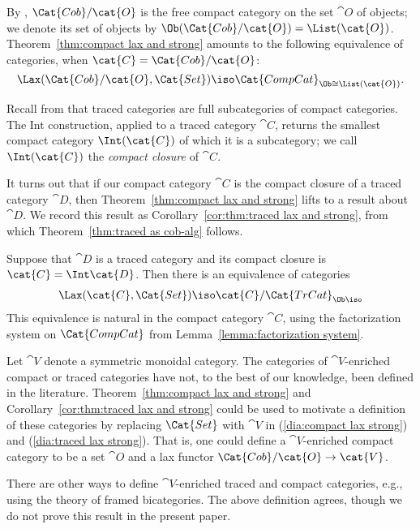 By \cite{Abramsky}, $\Cat{Cob}/\cat{O}$ is the free compact category on the set $\cat{O}$ of objects; we denote its set of objects by $\Ob(\Cat{Cob}/\cat{O})=\List(\cat{O})$. Theorem~\ref{thm:compact lax and strong} amounts to the following equivalence of categories, when $\cat{C}=\Cat{Cob}/\cat{O}$:
$$\Lax(\Cat{Cob}/\cat{O},\Cat{Set})\iso\Cat{CompCat}_{\Ob\cong\List(\cat{O})}.$$

Recall from \cite{JoyalStreetVerity} that traced categories are full subcategories of compact categories. The Int construction, applied to a traced category $\cat{C}$, returns the smallest compact category $\Int(\cat{C})$ of which it is a subcategory; we call $\Int(\cat{C})$ the \emph{compact closure} of $\cat{C}$. 

It turns out that if our compact category $\cat{C}$ is the compact closure of a traced category $\cat{D}$, then Theorem~\ref{thm:compact lax and strong} lifts to a result about $\cat{D}$. We record this result as Corollary~\ref{cor:thm:traced lax and strong}, from which Theorem~\ref{thm:traced as cob-alg} follows. 

\begin{corollary}\label{cor:thm:traced lax and strong}
Suppose that $\cat{D}$ is a traced category and its compact closure is $\cat{C}=\Int\cat{D}$. Then there is an equivalence of categories
\begin{align}\label{dia:traced lax strong}
\Lax(\cat{C},\Cat{Set})\iso\cat{C}/\Cat{TrCat}_{\Ob\iso}
\end{align}
This equivalence is natural in the compact category $\cat{C}$, using the factorization system on $\Cat{CompCat}$ from Lemma~\ref{lemma:factorization system}.
\end{corollary}

\begin{remark}

Let $\cat{V}$ denote a symmetric monoidal category. The categories of $\cat{V}$-enriched compact or traced categories have not, to the best of our knowledge, been defined in the literature. Theorem~\ref{thm:compact lax and strong} and Corollary~\ref{cor:thm:traced lax and strong} could be used to motivate a definition of these categories by replacing $\Cat{Set}$ with $\cat{V}$ in (\ref{dia:compact lax strong}) and (\ref{dia:traced lax strong}). That is, one could define a $\cat{V}$-enriched compact category to be a set $\cat{O}$ and a lax functor $\Cat{Cob}/\cat{O}\to\cat{V}$. 

There are other ways to define $\cat{V}$-enriched traced and compact categories, e.g., using the theory of framed bicategories. The above definition agrees, though we do not prove this result in the present paper.

\end{remark}

